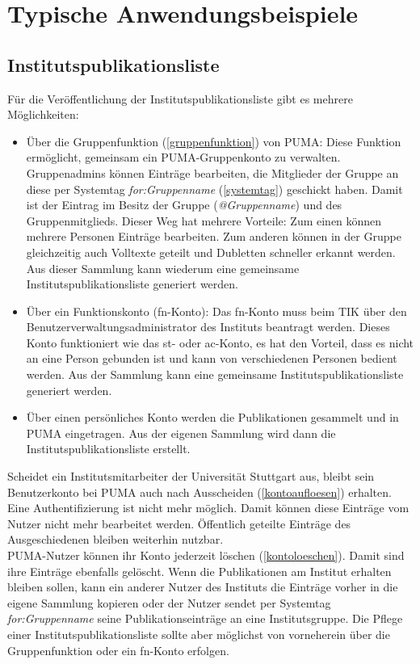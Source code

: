 \chapter{Typische Anwendungsbeispiele}
\label{ch:typischeAnwendungsbeispiele}

\section{Institutspublikationsliste}
\label{sec:institutspublikationsliste}
Für die Veröffentlichung der Institutspublikationsliste gibt es mehrere Möglichkeiten:
\begin{itemize}
\item Über die Gruppenfunktion (\autoref{gruppenfunktion}) von PUMA: Diese Funktion ermöglicht, gemeinsam ein PUMA-Gruppenkonto zu verwalten. Gruppenadmins können Einträge bearbeiten, die Mitglieder der Gruppe an diese per Systemtag \textit{for:Gruppenname} (\autoref{systemtag}) geschickt haben. Damit ist der Eintrag im Besitz der Gruppe (\textit{@Gruppenname}) und des Gruppenmitglieds. Dieser Weg hat mehrere Vorteile: Zum einen können mehrere Personen Einträge bearbeiten. Zum anderen können in der Gruppe gleichzeitig auch Volltexte geteilt und Dubletten schneller erkannt werden. Aus dieser  Sammlung kann wiederum eine gemeinsame Institutspublikationsliste generiert werden.
\item Über ein Funktionskonto (fn-Konto): Das fn-Konto muss beim TIK über den Benutzerverwaltungsadministrator des Instituts beantragt werden. Dieses Konto funktioniert wie das st- oder ac-Konto, es hat den Vorteil, dass es nicht an eine Person gebunden ist und kann von verschiedenen Personen bedient werden. Aus der Sammlung kann eine gemeinsame Institutspublikationsliste generiert werden.
\item Über einen persönliches Konto werden die Publikationen gesammelt und in PUMA eingetragen. Aus der eigenen Sammlung wird dann die Institutspublikationsliste erstellt.
\end{itemize}
Scheidet ein Institutsmitarbeiter der Universität Stuttgart aus, bleibt sein Benutzerkonto bei PUMA auch nach Ausscheiden (\autoref{kontoaufloesen}) erhalten. Eine Authentifizierung ist nicht mehr möglich. Damit können diese Einträge vom Nutzer nicht mehr bearbeitet werden. Öffentlich geteilte Einträge des Ausgeschiedenen bleiben weiterhin nutzbar.\\
PUMA-Nutzer können ihr Konto jederzeit löschen (\autoref{kontoloeschen}). Damit sind ihre Einträge ebenfalls gelöscht. Wenn die Publikationen am Institut erhalten bleiben sollen, kann ein anderer Nutzer des Instituts die Einträge vorher in die eigene Sammlung kopieren oder der Nutzer sendet per Systemtag \textit{for:Gruppenname} seine Publikationseinträge an eine Institutsgruppe. Die Pflege einer Institutspublikationsliste sollte aber möglichst von vorneherein über die Gruppenfunktion oder ein fn-Konto erfolgen.

